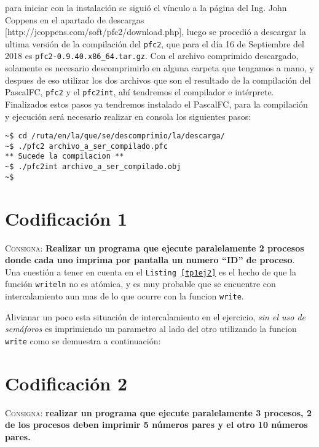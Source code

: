 \documentclass{article}
\begin{document}
para iniciar con la instalaci\'on se sigui\'o el v\'inculo a la p\'agina del Ing. John Coppens en el apartado de descargas [http://jcoppens.com/soft/pfc2/download.php], luego se procedi\'o a descargar la ultima versi\'on de la compilaci\'on del \texttt{pfc2}, que para el d\'ia 16 de Septiembre del 2018 es \texttt{pfc2-0.9.40.x86\_64.tar.gz}. Con el archivo comprimido descargado, solamente es necesario descomprimirlo en alguna carpeta que tengamos a mano, y despues de eso utilizar los dos archivos que son el resultado de la compilaci\'on del PascalFC, \texttt{pfc2} y el \texttt{pfc2int}, ah\'i tendremos el compilador e int\'erprete.\\

Finalizados estos pasos ya tendremos instalado el PascalFC, para la compilaci\'on y ejecuci\'on ser\'a necesario realizar en consola los siguientes pasos:

\begin{lstlisting}[caption={Compilaci\'on de y ejecuci\'on con pfc2}]
~$ cd /ruta/en/la/que/se/descomprimio/la/descarga/
~$ ./pfc2 archivo_a_ser_compilado.pfc
** Sucede la compilacion **
~$ ./pfc2int archivo_a_ser_compilado.obj
~$
\end{lstlisting}

\section{Codificaci\'on 1}
\textsc{Consigna}: \textbf{Realizar un programa que ejecute paralelamente 2 procesos donde cada uno imprima por pantalla un numero ``ID'' de proceso}.\\



Una cuesti\'on a tener en cuenta en el \texttt{Listing \ref{tp1ej2}} es  el hecho de que la funci\'on \texttt{writeln} no es at\'omica, y es muy probable que se encuentre con intercalamiento aun mas de lo que ocurre con la funcion \texttt{write}.

Alivianar un poco esta situaci\'on de intercalamiento en el ejercicio, \textit{sin el uso de sem\'aforos} es imprimiendo un parametro al lado del otro utilizando la funcion \texttt{write} como se demuestra a continuaci\'on:



\section{Codificaci\'on 2}
\textsc{Consigna}: \textbf{realizar un programa que ejecute paralelamente 3 procesos, 2 de los procesos deben imprimir 5 n\'umeros pares y el otro 10 n\'umeros pares.}
\end{document}
